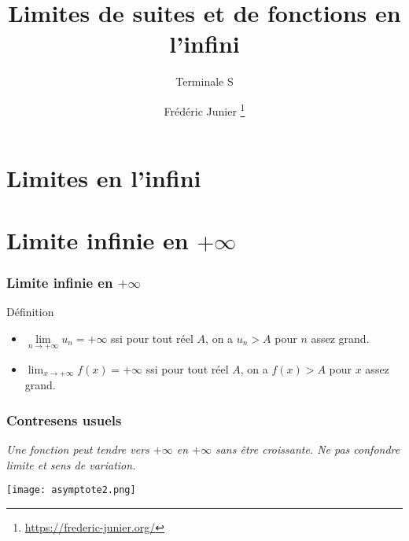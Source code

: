 \documentclass[xcolor=svgnames,t,final]{beamer}
\title{Limites de suites et de fonctions en l'infini}\subtitle{Terminale S}
\author[]{Frédéric Junier \thanks{\url{https://frederic-junier.org/} }}
\institute[Lycée du Parc]{Lycée du Parc, Lyon}
\date[]{}
\newcommand{\limitesuite}[1]{\lim\limits
_{n \to +\infty} #1}
\begin{document}
\frame{\titlepage}

\section{Limites en l'infini}


\section{Limite infinie en $+\infty$}
\begin{frame}

\frametitle{Limite infinie en $+\infty$}

\begin{block}{Définition}
\begin{itemize}
\pause \item {} 

$\limitesuite{u_{n}}=+\infty$ ssi pour tout réel $A$, on a $u_{n}>A$ pour $n$ assez grand.

\pause \item {} 

 $\lim_{x \to +\infty}{f(x)}=+\infty$ ssi pour tout réel $A$, on a $f(x)>A$ pour $x$ assez grand.
\end{itemize}
\end{block}

\end{frame}


\begin{frame}

\frametitle{Contresens usuels}

{\itshape  \bcattention{} Une fonction peut tendre vers $+\infty$ en $+\infty$ sans être croissante. Ne pas confondre limite et sens de variation.}


\begin{center}
\texttt{[image: asymptote2.png]}
\end{center}
\end{frame}
\end{document}
